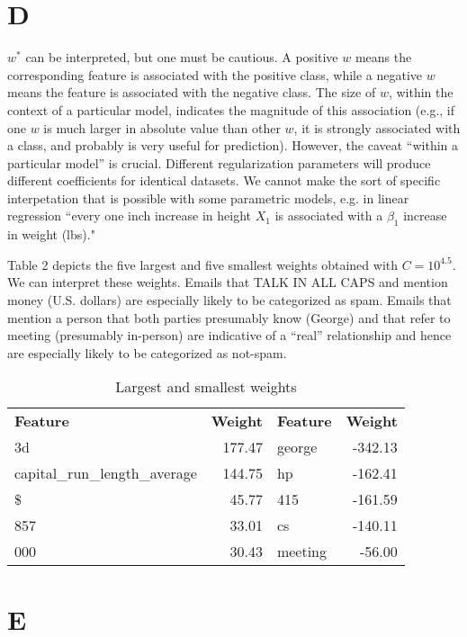 \documentclass{article}
\begin{document}
\section*{D}

$w^*$ can be interpreted, but one must be cautious. A positive $w$
means the corresponding feature is associated with the positive class, while a
negative $w$ means the feature is associated with the negative class. The size
of $w$, within the context of a particular model, indicates the magnitude of
this association (e.g., if one $w$ is much larger in absolute value than other $w$, it is
strongly associated with a class, and probably is very useful for prediction). 
However, the caveat ``within a particular model'' is
crucial. Different regularization parameters will produce different coefficients
for identical datasets. We cannot make the sort of specific
interpetation that is possible with some parametric models, e.g. in linear
regression ``every one inch increase in height $X_1$ is associated with a $\beta_1$
increase in weight (lbs)."

Table 2 depicts the five largest and five smallest weights obtained with
$C=10^{4.5}$. We can interpret these weights. Emails that TALK IN ALL CAPS and
mention money (U.S. dollars) are especially likely to be categorized as spam.
Emails that mention a person that both parties presumably know (George) and that
refer to meeting
(presumably in-person) are indicative of a ``real'' relationship and hence 
are especially likely to be categorized as not-spam.

\begin{table}[h!]
	\caption{Largest and smallest weights}
	\centering
	\begin{tabular}{|l r | l r|}
		\hline
		\textbf{Feature} & \textbf{Weight} & \textbf{Feature} &
		\textbf{Weight} \\
		3d & 177.47 & george & -342.13 \\
		capital\_run\_length\_average & 144.75 & hp & -162.41 \\
		\$ & 45.77 & 415 & -161.59 \\
		857 & 33.01 & cs & -140.11 \\
		000 & 30.43 & meeting & -56.00 \\
		\hline
	\end{tabular}
\end{table}

\section*{E}
\end{document}

